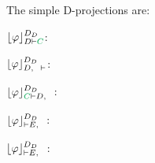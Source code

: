 \documentclass{llncs}
\begin{document}
\begin{example}
\label{example:DProjectionDefinitional}


The simple D-projections are:


\begin{multicols}{3}{
$\projectionDDefinitional{\varphi}{D \seq \hE{C}}$:
\begin{prooftree}
 
 
 
\end{prooftree}

$\projectionDDefinitional{\varphi}{D, \hF{C} \seq }$:
\begin{prooftree}
 
 
 
 
\end{prooftree}

$\projectionDDefinitional{\varphi}{\hE{C} \seq D, \hF{C}}$:
\begin{prooftree}
		 
		 
	 
\end{prooftree}
}
\end{multicols}


\begin{multicols}{3}{
$\projectionDDefinitional{\varphi}{\seq E, \hD{A}}$:
\begin{prooftree}
 
 
 
 
\end{prooftree}

$\projectionDDefinitional{\varphi}{\seq E, \hC{B}}$:
\begin{prooftree}
 
 
 
 
\end{prooftree}

}
\end{multicols}
\end{example}
\end{document}
